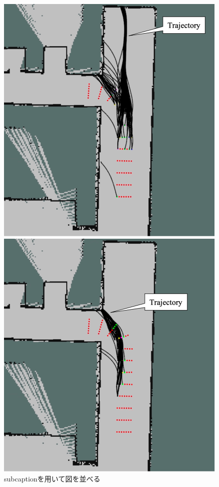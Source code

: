 \documentclass{jarticle}
\begin{document}
\vspace*{-2.5mm}
\begin{figure}[htbp]
  \begin{minipage}[t]{0.5\linewidth}
    \centering
    \includegraphics[keepaspectratio, scale=0.24]{figs/c.png}
  \end{minipage}
  \begin{minipage}[t]{0.5\linewidth}
    \centering
    \includegraphics[keepaspectratio, scale=0.24]{figs/d.png}
  \end{minipage}\vspace*{2mm}
  \caption{subcaptionを用いて図を並べる}
\end{figure}
\end{document}
